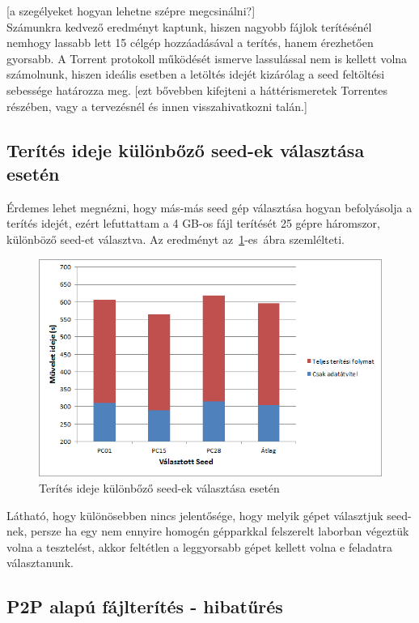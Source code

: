 [a szegélyeket hogyan lehetne szépre megcsinálni?]\\%

Számunkra kedvező eredményt kaptunk, hiszen nagyobb fájlok terítésénél nemhogy lassabb lett 15 célgép hozzáadásával a terítés, hanem érezhetően gyorsabb. A Torrent protokoll működését ismerve lassulással nem is kellett volna számolnunk, hiszen ideális esetben a letöltés idejét kizárólag a seed feltöltési sebessége határozza meg. [ezt bővebben kifejteni a háttérismeretek Torrentes részében, vagy a tervezésnél és innen visszahivatkozni talán.]%

%
\subsection{Terítés ideje különbőző seed-ek választása esetén}
%

Érdemes lehet megnézni, hogy más-más seed gép választása hogyan befolyásolja a terítés idejét, ezért lefuttattam a 4 GB-os fájl terítését 25 gépre háromszor, különböző seed-et választva. Az eredményt az~\ref{fig:differentseedscomparison}-es~ábra szemlélteti. 

\begin{figure}[ht]
\centering
\includegraphics[width=120mm, keepaspectratio]{figures/Perf_different_seeds.png}
\caption{Terítés ideje különbőző seed-ek választása esetén}
\label{fig:differentseedscomparison}
\end{figure}

Látható, hogy különösebben nincs jelentősége, hogy melyik gépet választjuk seed-nek, persze ha egy nem ennyire homogén gépparkkal felszerelt laborban végeztük volna a tesztelést, akkor feltétlen a leggyorsabb gépet kellett volna e feladatra választanunk.

%
\subsection{P2P alapú fájlterítés - hibatűrés}
%

